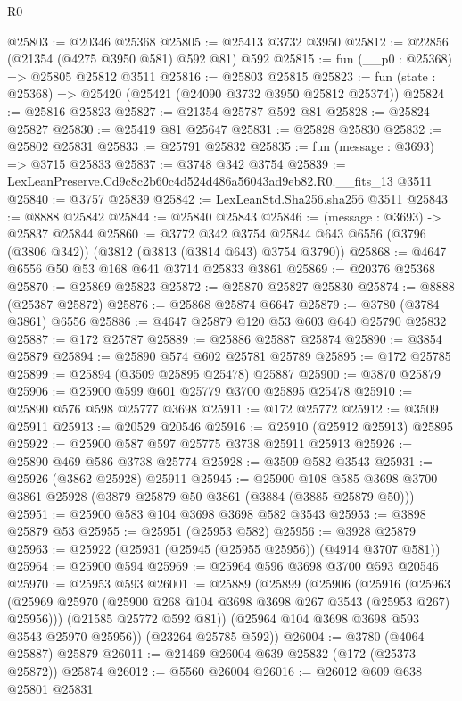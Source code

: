 \begin{lexlean}{R0}
\begin{coremodule}
@25803 := @20346 @25368
@25805 := @25413 @3732 @3950
@25812 := @22856 (@21354 (@4275 @3950 @581) @592 @81) @592
@25815 := fun (__p0 : @25368) => @25805 @25812 @3511
@25816 := @25803 @25815
@25823 := fun (state : @25368) => @25420 (@25421 (@24090 @3732 @3950 @25812 @25374))
@25824 := @25816 @25823
@25827 := @21354 @25787 @592 @81
@25828 := @25824 @25827
@25830 := @25419 @81 @25647
@25831 := @25828 @25830
@25832 := @25802 @25831
@25833 := @25791 @25832
@25835 := fun (message : @3693) => @3715 @25833
@25837 := @3748 @342 @3754
@25839 := LexLeanPreserve.Cd9c8c2b60c4d524d486a56043ad9eb82.R0.__fits_13 @3511
@25840 := @3757 @25839
@25842 := LexLeanStd.Sha256.sha256 @3511
@25843 := @8888 @25842
@25844 := @25840 @25843
@25846 := (message : @3693) -> @25837 @25844
@25860 := @3772
    @342
    @3754
    @25844
    @643
    @6556
    (@3796 (@3806 @342))
    (@3812 (@3813 (@3814 @643) @3754 @3790))
@25868 := @4647 @6556 @50 @53 @168 @641 @3714 @25833 @3861
@25869 := @20376 @25368
@25870 := @25869 @25823
@25872 := @25870 @25827 @25830
@25874 := @8888 (@25387 @25872)
@25876 := @25868 @25874 @6647
@25879 := @3780 (@3784 @3861) @6556
@25886 := @4647 @25879 @120 @53 @603 @640 @25790 @25832
@25887 := @172 @25787
@25889 := @25886 @25887 @25874
@25890 := @3854 @25879
@25894 := @25890 @574 @602 @25781 @25789
@25895 := @172 @25785
@25899 := @25894 (@3509 @25895 @25478) @25887
@25900 := @3870 @25879
@25906 := @25900 @599 @601 @25779 @3700 @25895 @25478
@25910 := @25890 @576 @598 @25777 @3698
@25911 := @172 @25772
@25912 := @3509 @25911
@25913 := @20529 @20546
@25916 := @25910 (@25912 @25913) @25895
@25922 := @25900 @587 @597 @25775 @3738 @25911 @25913
@25926 := @25890 @469 @586 @3738 @25774
@25928 := @3509 @582 @3543
@25931 := @25926 (@3862 @25928) @25911
@25945 := @25900
    @108
    @585
    @3698
    @3700
    @3861
    @25928
    (@3879 @25879 @50 @3861 (@3884 (@3885 @25879 @50)))
@25951 := @25900 @583 @104 @3698 @3698 @582 @3543
@25953 := @3898 @25879 @53
@25955 := @25951 (@25953 @582)
@25956 := @3928 @25879
@25963 := @25922 (@25931 (@25945 (@25955 @25956)) (@4914 @3707 @581))
@25964 := @25900 @594
@25969 := @25964 @596 @3698 @3700 @593 @20546
@25970 := @25953 @593
@26001 := @25889
    (@25899
      (@25906
        (@25916
          (@25963 (@25969 @25970 (@25900 @268 @104 @3698 @3698 @267 @3543 (@25953 @267) @25956)))
          (@21585 @25772 @592 @81))
        (@25964 @104 @3698 @3698 @593 @3543 @25970 @25956))
      (@23264 @25785 @592))
@26004 := @3780 (@4064 @25887) @25879
@26011 := @21469 @26004 @639 @25832 (@172 (@25373 @25872)) @25874
@26012 := @5560 @26004
@26016 := @26012 @609 @638 @25801 @25831

\end{coremodule}
\end{lexlean}
